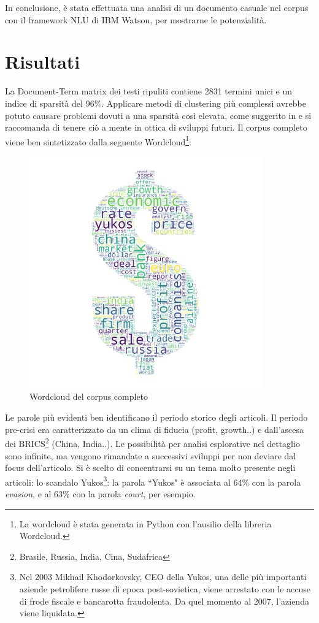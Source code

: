 \documentclass[]{article}
\begin{document}
In conclusione, è stata effettuata una analisi di un documento casuale nel corpus con il framework NLU di IBM Watson, per mostrarne le potenzialità.
\section{Risultati}
La Document-Term matrix dei testi ripuliti contiene 2831 termini unici e un indice di sparsità del 96\%. Applicare metodi di clustering più complessi avrebbe potuto causare problemi dovuti a una sparsità così elevata, come suggerito in \cite{GreeneOriginal} e si raccomanda di tenere ciò a mente in ottica di sviluppi futuri.
Il corpus completo viene ben sintetizzato dalla seguente Wordcloud\footnote{La wordcloud è stata generata in Python con l'ausilio della libreria Wordcloud.}:

\begin{figure}[H]
	\includegraphics[width=\linewidth, height=10cm]{../graphs/dollarcloud.png}
	\caption{Wordcloud del corpus completo}
\end{figure}

Le parole più evidenti ben identificano il periodo storico degli articoli. Il periodo pre-crisi era caratterizzato da un clima di fiducia (profit, growth..) e dall'ascesa dei BRICS\footnote{Brasile, Russia, India, Cina, Sudafrica} (China, India..).
Le possibilità per analisi esplorative nel dettaglio sono infinite, ma vengono rimandate a successivi sviluppi per non deviare dal focus dell'articolo.
\newline
Si è scelto di concentrarsi su un tema molto presente negli articoli: lo scandalo Yukos\footnote{Nel 2003 Mikhail Khodorkovsky, CEO della Yukos, una delle più importanti aziende petrolifere russe di epoca post-sovietica, viene arrestato con le accuse di frode fiscale e bancarotta fraudolenta. Da quel momento al 2007, l'azienda viene liquidata.}\cite{yukos}: la parola ``Yukos" è associata al 64\% con la parola \textit{evasion}, e al 63\% con la parola \textit{court}, per esempio.
\end{document}
